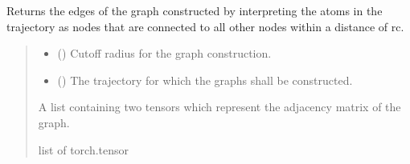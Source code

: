 \documentclass[a4paper,10pt,english]{report}
\begin{document}

\begin{fulllineitems}
\label{\detokenize{NNucleate:NNucleate.utils.get_rc_edges}}
\pysigstartsignatures
{}
\pysigstopsignatures
\sphinxAtStartPar
Returns the edges of the graph constructed by interpreting the atoms in the trajectory as nodes that are connected to all other nodes within a distance of rc.
\begin{quote}\begin{description}
\begin{itemize}
\item {} 
\sphinxAtStartPar
{} () \textendash{} Cut\sphinxhyphen{}off radius for the graph construction.

\item {} 
\sphinxAtStartPar
{} () \textendash{} The trajectory for which the graphs shall be constructed.

\end{itemize}

\sphinxAtStartPar
A list containing two tensors which represent the adjacency matrix of the graph.

\sphinxAtStartPar
list of torch.tensor

\end{description}\end{quote}

\end{fulllineitems}

\end{document}
